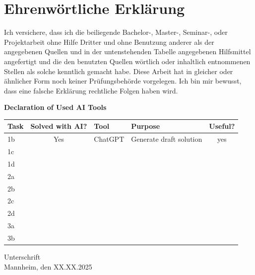 \section*{Ehrenwörtliche Erklärung}

Ich versichere, dass ich die beiliegende Bachelor-, Master-, Seminar-, oder
Projektarbeit ohne Hilfe Dritter und ohne Benutzung anderer als der angegebenen
Quellen und in der untenstehenden Tabelle angegebenen Hilfsmittel angefertigt
und die den benutzten Quellen wörtlich oder inhaltlich entnommenen Stellen als
solche kenntlich gemacht habe. Diese Arbeit hat in gleicher oder ähnlicher Form
noch keiner Prüfungsbehörde vorgelegen. Ich bin mir bewusst, dass eine falsche
Erklärung rechtliche Folgen haben wird.

%
%
\begin{center}
  \textbf{Declaration of Used AI Tools} \\[.3em]
  \begin{tabularx}{\textwidth}{lclXc}
    \toprule
    Task & Solved with AI? & Tool & Purpose & Useful? \\
    \midrule
    1b & Yes & ChatGPT & Generate draft solution & yes \\
    1c \\
    1d \\
    2a \\
    2b \\
    2c \\
    2d \\
    3a \\
    3b \\
    \bottomrule
  \end{tabularx}
\end{center}

\vspace{2cm}
\noindent Unterschrift\\
\noindent Mannheim, den XX.XX.2025 \hfill
